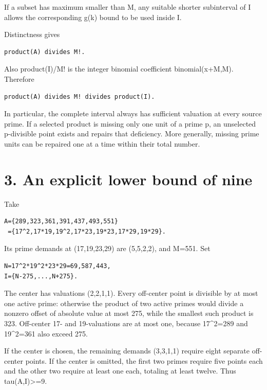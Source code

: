 \documentclass[11pt,a4paper]{article}
\begin{document}
If a subset has maximum smaller than M, any suitable shorter subinterval
of I allows the corresponding g(k) bound to be used inside I.

Distinctness gives

\begin{verbatim}
product(A) divides M!.
\end{verbatim}

Also product(I)/M! is the integer binomial coefficient binomial(x+M,M).
Therefore

\begin{verbatim}
product(A) divides M! divides product(I).
\end{verbatim}

In particular, the complete interval always has sufficient valuation at
every source prime. If a selected product is missing only one unit of a
prime p, an unselected p-divisible point exists and repairs that
deficiency. More generally, missing prime units can be repaired one at a
time within their total number.

\section{3. An explicit lower bound of
nine}\label{an-explicit-lower-bound-of-nine}

Take

\begin{verbatim}
A={289,323,361,391,437,493,551}
 ={17^2,17*19,19^2,17*23,19*23,17*29,19*29}.
\end{verbatim}

Its prime demands at (17,19,23,29) are (5,5,2,2), and M=551. Set

\begin{verbatim}
N=17^2*19^2*23*29=69,587,443,
I={N-275,...,N+275}.
\end{verbatim}

The center has valuations (2,2,1,1). Every off-center point is divisible
by at most one active prime: otherwise the product of two active primes
would divide a nonzero offset of absolute value at most 275, while the
smallest such product is 323. Off-center 17- and 19-valuations are at
most one, because 17\^{}2=289 and 19\^{}2=361 also exceed 275.

If the center is chosen, the remaining demands (3,3,1,1) require eight
separate off-center points. If the center is omitted, the first two
primes require five points each and the other two require at least one
each, totaling at least twelve. Thus tau(A,I)\textgreater=9.
\end{document}
